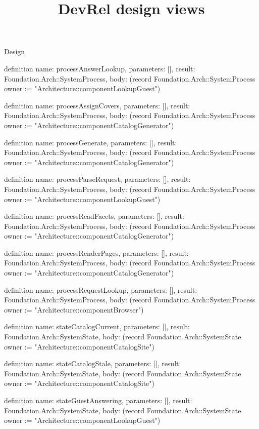 \begin{lexlean}{Design}
\title{DevRel design views}
\begin{semanticmodule}
definition{
  name: processAnswerLookup,
  parameters: [],
  result: Foundation.Arch::SystemProcess,
  body: (record Foundation.Arch::SystemProcess {owner := "Architecture::componentLookupGuest"})
}

definition{
  name: processAssignCovers,
  parameters: [],
  result: Foundation.Arch::SystemProcess,
  body: (record Foundation.Arch::SystemProcess {owner := "Architecture::componentCatalogGenerator"})
}

definition{
  name: processGenerate,
  parameters: [],
  result: Foundation.Arch::SystemProcess,
  body: (record Foundation.Arch::SystemProcess {owner := "Architecture::componentCatalogGenerator"})
}

definition{
  name: processParseRequest,
  parameters: [],
  result: Foundation.Arch::SystemProcess,
  body: (record Foundation.Arch::SystemProcess {owner := "Architecture::componentLookupGuest"})
}

definition{
  name: processReadFacets,
  parameters: [],
  result: Foundation.Arch::SystemProcess,
  body: (record Foundation.Arch::SystemProcess {owner := "Architecture::componentCatalogGenerator"})
}

definition{
  name: processRenderPages,
  parameters: [],
  result: Foundation.Arch::SystemProcess,
  body: (record Foundation.Arch::SystemProcess {owner := "Architecture::componentCatalogGenerator"})
}

definition{
  name: processRequestLookup,
  parameters: [],
  result: Foundation.Arch::SystemProcess,
  body: (record Foundation.Arch::SystemProcess {owner := "Architecture::componentBrowser"})
}

definition{
  name: stateCatalogCurrent,
  parameters: [],
  result: Foundation.Arch::SystemState,
  body: (record Foundation.Arch::SystemState {owner := "Architecture::componentCatalogSite"})
}

definition{
  name: stateCatalogStale,
  parameters: [],
  result: Foundation.Arch::SystemState,
  body: (record Foundation.Arch::SystemState {owner := "Architecture::componentCatalogSite"})
}

definition{
  name: stateGuestAnswering,
  parameters: [],
  result: Foundation.Arch::SystemState,
  body: (record Foundation.Arch::SystemState {owner := "Architecture::componentLookupGuest"})
}


\end{semanticmodule}
\end{lexlean}
